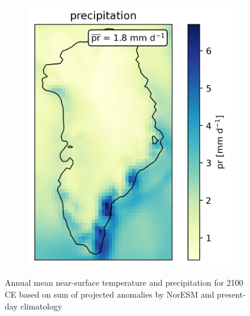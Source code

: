 \begin{figure}
\begin{subfigure}{0.44\textwidth}
		\includegraphics[width=\textwidth]{../global-warming/figs/21c-pr-mean.png}
	\end{subfigure}
	\caption{Annual mean near-surface temperature and precipitation for 2100 CE based on sum of projected anomalies by NorESM and present-day climatology}
	\label{fig:21c-warming}
\end{figure}
